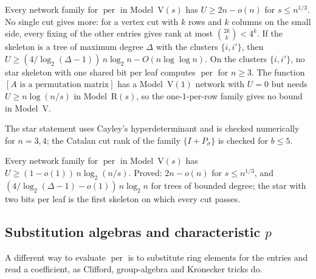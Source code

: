 \documentclass[10pt]{amsart}
\theoremstyle{plain}
\theoremstyle{definition}
\theoremstyle{remark}
\numberwithin{equation}{section}
\newcommand{\per}{\operatorname{per}}
\begin{document}
\begin{proposition}\label{prop:modelV}
Every network family for $\per$ in Model~V$(s)$ has $U\ge2n-o(n)$ for $s\le n^{1/3}$. No single cut gives
more: for a vertex cut with $k$ rows and $k$ columns on the small side, every fixing of the other
entries gives rank at most $\binom{2k}k<4^k$. If the skeleton is a tree of maximum degree $\Delta$ with
the clusters $\{i,i'\}$, then $U\ge(4/\log_2(\Delta-1))\,n\log_2n-O(n\log\log n)$. On the clusters
$\{i,i'\}$, no star skeleton with one shared bit per leaf computes $\per$ for $n\ge3$. The function
$[A\text{ is a permutation matrix}]$ has a Model~V$(1)$ network with $U=0$ but needs
$U\ge n\log(n/s)$ in Model~R$(s)$, so the one-$1$-per-row family gives no bound in Model~V.
\end{proposition}

\noindent The star statement uses Cayley's hyperdeterminant and is checked numerically for $n=3,4$;
the Catalan cut rank of the family $\{I+P_\sigma\}$ is checked for $b\le5$.
\begin{conjecture}\label{conj:modelV}
Every network family for $\per$ in Model~V$(s)$ has $U\ge(1-o(1))\,n\log_2(n/s)$. Proved: $2n-o(n)$ for
$s\le n^{1/3}$, and $(4/\log_2(\Delta-1)-o(1))\,n\log_2n$ for trees of bounded degree; the star with two
bits per leaf is the first skeleton on which every cut passes.
\end{conjecture}

\subsection{Substitution algebras and characteristic \texorpdfstring{$p$}{p}}\label{sec:algebra}
A different way to evaluate $\per$ is to substitute ring elements for the entries and read a
coefficient, as Clifford, group-algebra and Kronecker tricks do.
\end{document}
